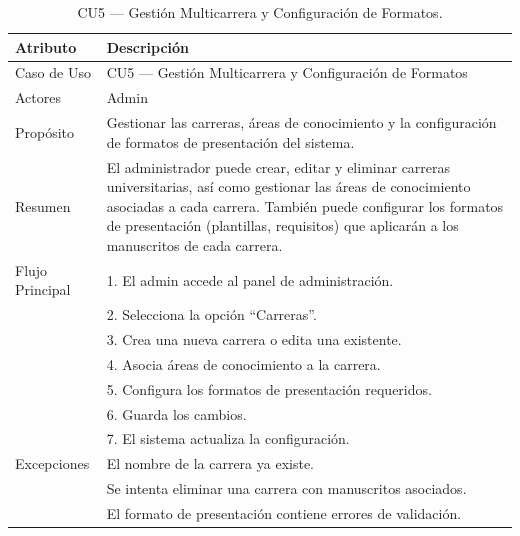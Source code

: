 \begin{table}[H]
\centering
\caption{CU5 — Gestión Multicarrera y Configuración de Formatos.}
\label{tab:cu5}
\begin{tabular}{lp{10cm}}
\toprule
\textbf{Atributo} & \textbf{Descripción} \\
\midrule
Caso de Uso & CU5 — Gestión Multicarrera y Configuración de Formatos \\
Actores & Admin \\
Propósito & Gestionar las carreras, áreas de conocimiento y la configuración de formatos de presentación del sistema. \\
Resumen & El administrador puede crear, editar y eliminar carreras universitarias, así como gestionar las áreas de conocimiento asociadas a cada carrera. También puede configurar los formatos de presentación (plantillas, requisitos) que aplicarán a los manuscritos de cada carrera. \\
Flujo Principal & 1. El admin accede al panel de administración. \\
& 2. Selecciona la opción ``Carreras''. \\
& 3. Crea una nueva carrera o edita una existente. \\
& 4. Asocia áreas de conocimiento a la carrera. \\
& 5. Configura los formatos de presentación requeridos. \\
& 6. Guarda los cambios. \\
& 7. El sistema actualiza la configuración. \\
Excepciones & El nombre de la carrera ya existe. \\
& Se intenta eliminar una carrera con manuscritos asociados. \\
& El formato de presentación contiene errores de validación. \\
\bottomrule
\end{tabular}
\end{table}

